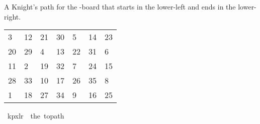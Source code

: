 \begin{isabellebody}
\begin{isamarkuptext}%
A Knight's path for the -board that starts in the lower-left and ends in the 
lower-right.
  \begin{table}[H]
    \begin{tabular}{lllllll}
       3 & 12 & 21 & 30 &  5 & 14 & 23 \\
      20 & 29 &  4 & 13 & 22 & 31 &  6 \\
      11 &  2 & 19 & 32 &  7 & 24 & 15 \\
      28 & 33 & 10 & 17 & 26 & 35 &  8 \\
       1 & 18 & 27 & 34 &  9 & 16 & 25
    \end{tabular}
  \end{table}%
\end{isamarkuptext}\isamarkuptrue%
\isamarkupfalse%
\ {\isachardoublequoteopen}kp{}x{}lr\ {\isasymequiv}\ the\ {\isacharparenleft}{\kern0pt}to{\isacharunderscore}{\kern0pt}path\ \isanewline
\ \ {\isacharbrackleft}{\kern0pt}{\isacharbrackleft}{\kern0pt}{}{\isacharcomma}{\kern0pt}{}{}{\isacharcomma}{\kern0pt}{}{}{\isacharcomma}{\kern0pt}{}{}{\isacharcomma}{\kern0pt}{}{\isacharcomma}{\kern0pt}{}{}{\isacharcomma}{\kern0pt}{}{}{\isacharbrackright}{\kern0pt}{\isacharcomma}{\kern0pt}\isanewline
\ \ {\isacharbrackleft}{\kern0pt}{}{}{\isacharcomma}{\kern0pt}{}{}{\isacharcomma}{\kern0pt}{}{\isacharcomma}{\kern0pt}{}{}{\isacharcomma}{\kern0pt}{}{}{\isacharcomma}{\kern0pt}{}{}{\isacharcomma}{\kern0pt}{}{\isacharbrackright}{\kern0pt}{\isacharcomma}{\kern0pt}\isanewline
\ \ {\isacharbrackleft}{\kern0pt}{}{}{\isacharcomma}{\kern0pt}{}{\isacharcomma}{\kern0pt}{}{}{\isacharcomma}{\kern0pt}{}{}{\isacharcomma}{\kern0pt}{}{\isacharcomma}{\kern0pt}{}{}{\isacharcomma}{\kern0pt}{}{}{\isacharbrackright}{\kern0pt}{\isacharcomma}{\kern0pt}\isanewline
\ \ {\isacharbrackleft}{\kern0pt}{}{}{\isacharcomma}{\kern0pt}{}{}{\isacharcomma}{\kern0pt}{}{}{\isacharcomma}{\kern0pt}{}{}{\isacharcomma}{\kern0pt}{}{}{\isacharcomma}{\kern0pt}{}{}{\isacharcomma}{\kern0pt}{}{\isacharbrackright}{\kern0pt}{\isacharcomma}{\kern0pt}\isanewline

\end{isabellebody}
